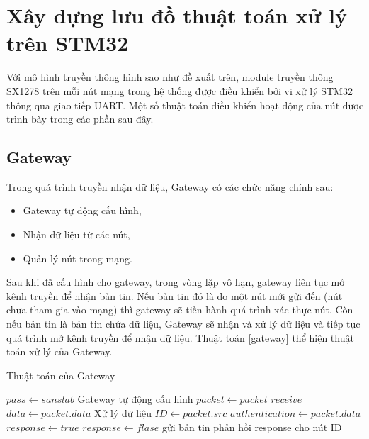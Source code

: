 \section{Xây dựng lưu đồ thuật toán xử lý trên STM32}   
Với mô hình truyền thông hình sao như đề xuất trên, module truyền thông SX1278 trên mỗi nút mạng trong hệ thống được điều khiển bởi vi xử lý STM32 thông qua giao tiếp UART. Một số thuật toán điều khiển hoạt động của nút được trình bày trong các phần sau đây. 
\subsection{Gateway} 
 Trong quá trình truyền nhận dữ liệu, Gateway có các chức năng chính sau:
 \begin{itemize}
 \item	Gateway tự động cấu hình,
 \item	Nhận dữ liệu từ các nút,
 \item	Quản lý nút trong mạng.
 \end{itemize}
 \par 
Sau khi đã cấu hình cho gateway, trong vòng lặp vô hạn, gateway liên tục mở kênh truyền để nhận bản tin. Nếu bản tin đó là do một nút mới gửi đến (nút chưa tham gia vào mạng) thì gateway sẽ tiến hành quá trình xác thực nút. Còn nếu bản tin là bản tin chứa dữ liệu, Gateway sẽ nhận và xử lý dữ liệu và tiếp tục quá trình mở kênh truyền để nhận dữ liệu. Thuật toán \ref{gateway} thể hiện thuật toán xử lý của Gateway.
\begin{center}
\begin{algorithm}[h]
	\caption{Thuật toán của Gateway}
	\label{gateway}
	\begin{algorithmic}[1]
		\State $pass \gets sanslab$
		\State Gateway tự động cấu hình  
				\State $packet \gets packet\_receive$	
					\State $data \gets packet.data$
					\State Xử lý dữ liệu	
					\State	$ID \gets packet.src$	
					\State	$authentication \gets packet.data$ 
					\State 	$response \gets true$
						\State $response \gets flase$
					\EndIf
					\State gửi bản tin phản hồi response cho nút ID
				\EndIf
			\EndIf		
		\EndWhile
	\end{algorithmic}
\end{algorithm}
\end{center}
